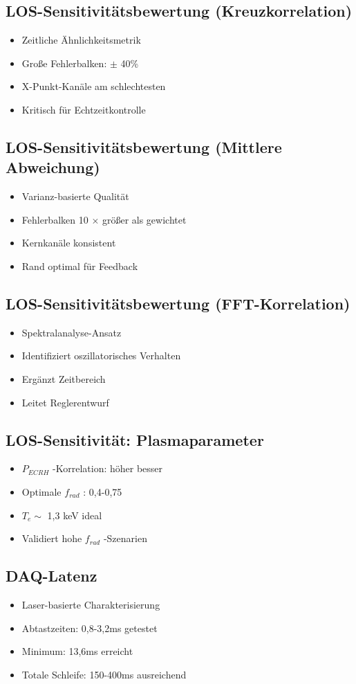 \documentclass[11pt,a4paper]{article}
\begin{document}
\subsection{LOS-Sensitivitätsbewertung (Kreuzkorrelation)}

\begin{itemize}
\item Zeitliche Ähnlichkeitsmetrik
\item Große Fehlerbalken: $\pm $ 40\%
\item X-Punkt-Kanäle am schlechtesten
\item Kritisch für Echtzeitkontrolle
\end{itemize}

\subsection{LOS-Sensitivitätsbewertung (Mittlere Abweichung)}

\begin{itemize}
\item Varianz-basierte Qualität
\item Fehlerbalken 10 $\times $ größer als gewichtet
\item Kernkanäle konsistent
\item Rand optimal für Feedback
\end{itemize}

\subsection{LOS-Sensitivitätsbewertung (FFT-Korrelation)}

\begin{itemize}
\item Spektralanalyse-Ansatz
\item Identifiziert oszillatorisches Verhalten
\item Ergänzt Zeitbereich
\item Leitet Reglerentwurf
\end{itemize}

\subsection{LOS-Sensitivität: Plasmaparameter}

\begin{itemize}
\item $ P_{ECRH} $ -Korrelation: höher besser
\item Optimale $ f_{rad} $ : 0,4-0,75
\item $ T_e \sim $ 1,3 keV ideal
\item Validiert hohe $ f_{rad} $ -Szenarien
\end{itemize}

\subsection{DAQ-Latenz}

\begin{itemize}
\item Laser-basierte Charakterisierung
\item Abtastzeiten: 0,8-3,2ms getestet
\item Minimum: 13,6ms erreicht
\item Totale Schleife: 150-400ms ausreichend
\end{itemize}
\end{document}

